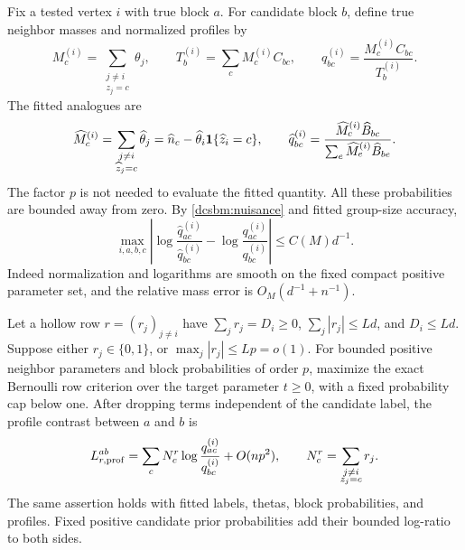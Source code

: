 Fix a tested vertex \(i\) with true block \(a\).  For candidate
block \(b\), define true neighbor masses and normalized profiles by
\begin{equation}
 M_c^{(i)}=\sum_{\substack{j\ne i\\z_j=c}}\theta_j,\qquad
 T_b^{(i)}=\sum_c M_c^{(i)}C_{bc},\qquad
 q_{bc}^{(i)}=\frac{M_c^{(i)}C_{bc}}{T_b^{(i)}} .
 \label{dcsbm:q-true}
\end{equation}
The fitted analogues are
\begin{equation}
 \widehat M_c^{(i)}
 =\sum_{\substack{j\ne i\\\widehat z_j=c}}\widehat\theta_j
 =\widehat n_c-\widehat\theta_i\mathbf1\{\widehat z_i=c\},
 \qquad
 \widehat q_{bc}^{(i)}
 =\frac{\widehat M_c^{(i)}\widehat B_{bc}}
        {\sum_e\widehat M_e^{(i)}\widehat B_{be}}.
 \label{dcsbm:q-fitted}
\end{equation}
The factor \(p\) is not needed to evaluate the fitted quantity.
All these probabilities are bounded away from zero.
By \cref{dcsbm:nuisance} and fitted group-size accuracy,
\begin{equation}
 \max_{i,a,b,c}
 \left|\log\frac{\widehat q_{ac}^{(i)}}{\widehat q_{bc}^{(i)}}
          -\log\frac{q_{ac}^{(i)}}{q_{bc}^{(i)}}\right|
 \le C(M)d^{-1}.
 \label{dcsbm:q-rate}
\end{equation}
Indeed normalization and logarithms are smooth on the fixed compact
positive parameter set, and the relative mass error is
\(O_M(d^{-1}+n^{-1})\).

\begin{lemma}
\label{dcsbm:profile-reduction}
Let a hollow row \(r=(r_j)_{j\ne i}\) have
\(\sum_jr_j=D_i\ge0\), \(\sum_j|r_j|\le Ld\), and \(D_i\le Ld\).
Suppose either \(r_j\in\{0,1\}\), or
\(\max_j|r_j|\le Lp=o(1)\).
For bounded positive neighbor parameters and block probabilities
of order \(p\), maximize the exact Bernoulli row criterion over
the target parameter \(t\ge0\), with a fixed probability cap below
one.  After dropping terms independent of the candidate label,
the profile contrast between \(a\) and \(b\) is
\begin{equation}
 L^{ab}_{r,\rm prof}
 =\sum_c N_c^r\log\frac{q_{ac}^{(i)}}{q_{bc}^{(i)}}
       +O(np^2),\qquad
 N_c^r=\sum_{\substack{j\ne i\\z_j=c}}r_j .
 \label{dcsbm:profile-linear}
\end{equation}
The same assertion holds with fitted labels, thetas, block probabilities,
and profiles.  Fixed positive candidate prior probabilities add their
bounded log-ratio to both sides.
\end{lemma}

